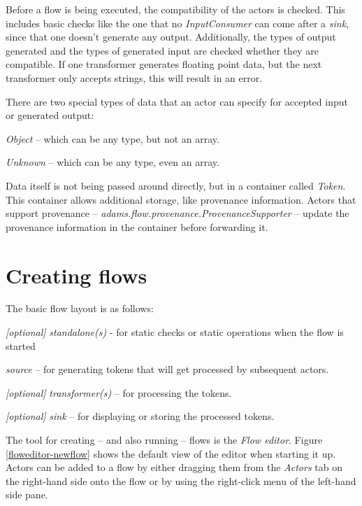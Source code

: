Before a flow is being executed, the compatibility of the actors is
checked. This includes basic checks like the one that no \textit{InputConsumer}
can come after a \textit{sink}, since that one doesn't generate any output.
Additionally, the types of output generated and the types of generated input are
checked whether they are compatible. If one transformer generates floating
point data, but the next transformer only accepts strings, this will result in
an error.

There are two special types of data that an actor can specify for accepted input
or generated output:
\begin{tight_itemize}
  \item \textit{Object} -- which can be any type, but not an array.
  \item \textit{Unknown} -- which can be any type, even an array.
\end{tight_itemize}

\noindent Data itself is not being passed around directly, but in a container
called \textit{Token}. This container allows additional storage, like provenance
information. Actors that support provenance -- \textit{adams.flow.provenance.ProvenanceSupporter} --
update the provenance information in the container before forwarding it.

\newpage
\section{Creating flows}
The basic flow layout is as follows:
\begin{tight_itemize}
  \item \textit{[optional]} \textit{standalone(s)} - for static checks or static
  operations when the flow is started
  \item \textit{source} -- for generating tokens that will get processed by
  subsequent actors.
  \item \textit{[optional]} \textit{transformer(s)} -- for processing the
  tokens.
  \item \textit{[optional]} \textit{sink} -- for displaying or storing the
  processed tokens.
\end{tight_itemize}
The tool for creating -- and also running -- flows is the \textit{Flow editor}.
Figure \ref{floweditor-newflow} shows the default view of the editor when
starting it up. Actors can be added to a flow by either dragging them from the
\textit{Actors} tab on the right-hand side onto the flow or by using the
right-click menu of the left-hand side pane.

